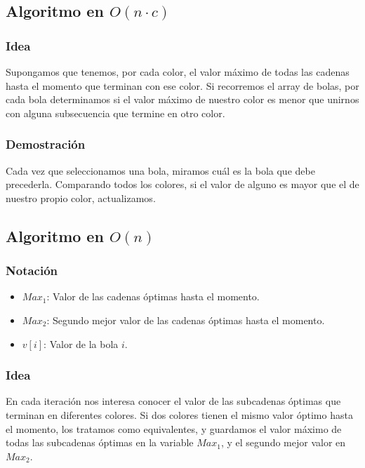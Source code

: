 \documentclass{article}
\begin{document}
\subsection*{Algoritmo en $O(n \cdot c)$}
\subsubsection*{Idea}
Supongamos que tenemos, por cada color, el valor máximo de todas las cadenas hasta el momento que terminan con ese color. Si recorremos el array de bolas, por cada bola determinamos si el valor máximo de nuestro color es menor que unirnos con alguna subsecuencia que termine en otro color.

\subsubsection*{Demostración}
Cada vez que seleccionamos una bola, miramos cuál es la bola que debe precederla. Comparando todos los colores, si el valor de alguno es mayor que el de nuestro propio color, actualizamos.

\subsection*{Algoritmo en $O(n)$}
\subsubsection*{Notación}
\begin{itemize}
    \item $Max_1$: Valor de las cadenas óptimas hasta el momento.
    \item $Max_2$: Segundo mejor valor de las cadenas óptimas hasta el momento.
    \item $v[i]$: Valor de la bola $i$.
\end{itemize}

\subsubsection*{Idea}
En cada iteración nos interesa conocer el valor de las subcadenas óptimas que terminan en diferentes colores. Si dos colores tienen el mismo valor óptimo hasta el momento, los tratamos como equivalentes, y guardamos el valor máximo de todas las subcadenas óptimas en la variable $Max_1$, y el segundo mejor valor en $Max_2$.
\end{document}
